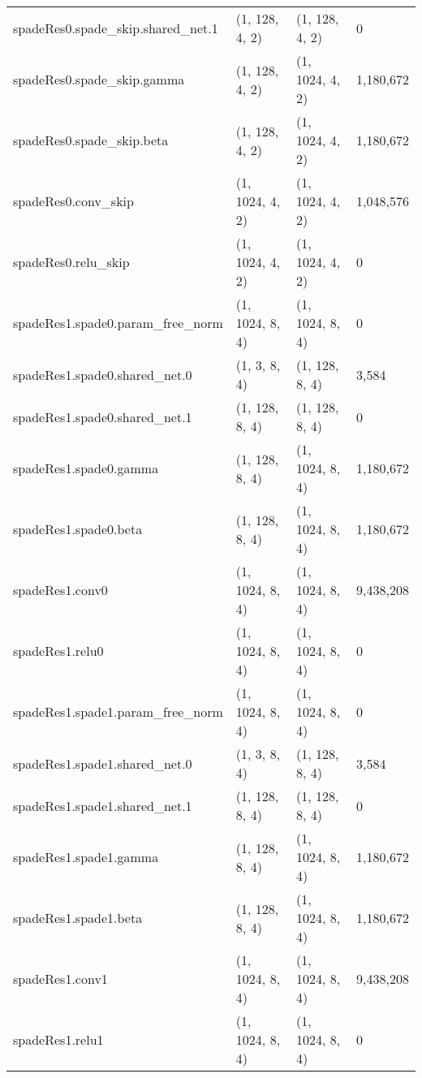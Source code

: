 \begin{longtable}{llll}
        spadeRes0.spade\_skip.shared\_net.1 &      (1, 128, 4, 2) &      (1, 128, 4, 2) &            0 \\
            spadeRes0.spade\_skip.gamma &      (1, 128, 4, 2) &     (1, 1024, 4, 2) &    1,180,672 \\
                spadeRes0.spade\_skip.beta &      (1, 128, 4, 2) &     (1, 1024, 4, 2) &    1,180,672 \\
                    spadeRes0.conv\_skip &     (1, 1024, 4, 2) &     (1, 1024, 4, 2) &    1,048,576 \\
                    spadeRes0.relu\_skip &     (1, 1024, 4, 2) &     (1, 1024, 4, 2) &            0 \\
        spadeRes1.spade0.param\_free\_norm &     (1, 1024, 8, 4) &     (1, 1024, 8, 4) &            0 \\
            spadeRes1.spade0.shared\_net.0 &        (1, 3, 8, 4) &      (1, 128, 8, 4) &        3,584 \\
            spadeRes1.spade0.shared\_net.1 &      (1, 128, 8, 4) &      (1, 128, 8, 4) &            0 \\
                spadeRes1.spade0.gamma &      (1, 128, 8, 4) &     (1, 1024, 8, 4) &    1,180,672 \\
                    spadeRes1.spade0.beta &      (1, 128, 8, 4) &     (1, 1024, 8, 4) &    1,180,672 \\
                        spadeRes1.conv0 &     (1, 1024, 8, 4) &     (1, 1024, 8, 4) &    9,438,208 \\
                        spadeRes1.relu0 &     (1, 1024, 8, 4) &     (1, 1024, 8, 4) &            0 \\
        spadeRes1.spade1.param\_free\_norm &     (1, 1024, 8, 4) &     (1, 1024, 8, 4) &            0 \\
            spadeRes1.spade1.shared\_net.0 &        (1, 3, 8, 4) &      (1, 128, 8, 4) &        3,584 \\
            spadeRes1.spade1.shared\_net.1 &      (1, 128, 8, 4) &      (1, 128, 8, 4) &            0 \\
                spadeRes1.spade1.gamma &      (1, 128, 8, 4) &     (1, 1024, 8, 4) &    1,180,672 \\
                    spadeRes1.spade1.beta &      (1, 128, 8, 4) &     (1, 1024, 8, 4) &    1,180,672 \\
                        spadeRes1.conv1 &     (1, 1024, 8, 4) &     (1, 1024, 8, 4) &    9,438,208 \\
                        spadeRes1.relu1 &     (1, 1024, 8, 4) &     (1, 1024, 8, 4) &            0 \\

\end{longtable}
